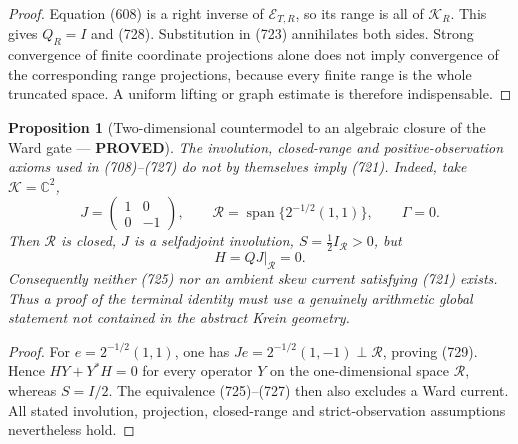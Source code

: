 \documentclass[11pt]{article}
\newtheorem{proposition}[theorem]{Proposition}
\newcommand{\PROVED}{\textcolor{green!45!black}{\textbf{PROVED}}}
\begin{document}
\begin{proof}
Equation (608) is a right inverse of \(\mathcal E_{T,R}\), so its range is
all of \(\mathscr K_R\).  This gives \(Q_R=I\) and (728).  Substitution in
(723) annihilates both sides.  Strong convergence of finite coordinate
projections alone does not imply convergence of the corresponding range
projections, because every finite range is the whole truncated space.  A
uniform lifting or graph estimate is therefore indispensable.
\end{proof}

\begin{proposition}[Two-dimensional countermodel to an algebraic closure
of the Ward gate --- \PROVED]
The involution, closed-range and positive-observation axioms used in
(708)--(727) do not by themselves imply (721).  Indeed, take
\(\mathscr K=\mathbb C^2\),
\[
 J=\begin{pmatrix}1&0\\0&-1\end{pmatrix},\qquad
 \mathscr R=\operatorname{span}\{2^{-1/2}(1,1)\},
 \qquad \Gamma=0.
\]
Then \(\mathscr R\) is closed, \(J\) is a selfadjoint involution,
\(S=\frac12I_{\mathscr R}>0\), but
\begin{equation}
 H=QJ|_{\mathscr R}=0.                              \tag{729}
\end{equation}
Consequently neither (725) nor an ambient skew current satisfying (721)
exists.  Thus a proof of the terminal identity must use a genuinely
arithmetic global statement not contained in the abstract Krein geometry.
\end{proposition}

\begin{proof}
For \(e=2^{-1/2}(1,1)\), one has
\(Je=2^{-1/2}(1,-1)\perp\mathscr R\), proving (729).  Hence
\(HY+Y^*H=0\) for every operator \(Y\) on the one-dimensional space
\(\mathscr R\), whereas \(S=I/2\).  The equivalence (725)--(727) then also
excludes a Ward current.  All stated involution, projection, closed-range
and strict-observation assumptions nevertheless hold.
\end{proof}
\end{document}
